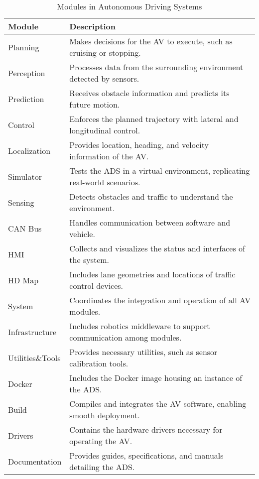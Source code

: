\begin{table}[ht]
    \centering
    \caption{Modules in Autonomous Driving Systems}
    \begin{adjustbox}{width=0.9\linewidth}
    \begin{tabular}{|l|l|}
    \hline
    \textbf{Module} & \textbf{Description} \\
    \hline
    Planning & Makes decisions for the AV to execute, such as cruising or stopping. \\
    \hline
    Perception & Processes data from the surrounding environment detected by sensors. \\
    \hline
    Prediction & Receives obstacle information and predicts its future motion. \\
    \hline
    Control & Enforces the planned trajectory with lateral and longitudinal control. \\
    \hline
    Localization & Provides location, heading, and velocity information of the AV. \\
    \hline
    Simulator & Tests the ADS in a virtual environment, replicating real-world scenarios. \\
    \hline
    Sensing & Detects obstacles and traffic to understand the environment. \\
    \hline
    CAN Bus & Handles communication between software and vehicle. \\
    \hline
    HMI & Collects and visualizes the status and interfaces of the system. \\
    \hline
    HD Map & Includes lane geometries and locations of traffic control devices. \\
    \hline
    System & Coordinates the integration and operation of all AV modules. \\
    \hline
    Infrastructure & Includes robotics middleware to support communication among modules. \\
    \hline
    Utilities\&Tools & Provides necessary utilities, such as sensor calibration tools. \\
    \hline
    Docker & Includes the Docker image housing an instance of the ADS. \\
    \hline
    Build & Compiles and integrates the AV software, enabling smooth deployment. \\
    \hline
    Drivers & Contains the hardware drivers necessary for operating the AV. \\
    \hline
    Documentation & Provides guides, specifications, and manuals detailing the ADS. \\
    \hline
    \end{tabular}
    \end{adjustbox}
    \label{tab:modules_ads}
\end{table}



